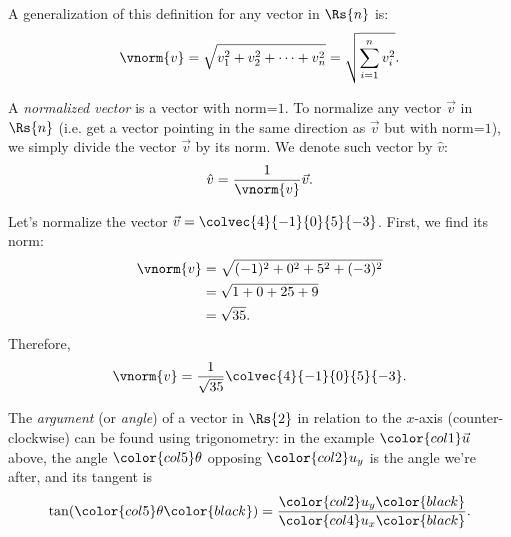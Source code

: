 A generalization of this definition for any vector in $\Rs{n}$ is:
\begin{equation*}
  \vnorm{v} = \sqrt{v_{1}^{2} + v_{2}^{2} + \dots + v_{n}^{2}} = \sqrt{\sum\limits_{i=1}^{n}v_{i}^{2}}.
\end{equation*}

A \emph{normalized vector} is a vector with norm=$1$. To normalize any vector $\vec{v}$ in $\Rs{n}$ (i.e. get a vector pointing in the same direction as $\vec{v}$ but with norm=$1$), we simply divide the vector $\vec{v}$ by its norm. We denote such vector by $\hat{v}$:
\begin{equation*}
  \hat{v} = \frac{1}{\vnorm{v}}\vec{v}.
\end{equation*}

\begin{example}
  Let's normalize the vector $\vec{v} = \colvec{4}{-1}{0}{5}{-3}$. First, we find its norm:
  \begin{align*}
  \vnorm{v} &= \sqrt{(-1)^{2} + 0^{2} + 5^{2} + (-3)^{2}}\\
  &= \sqrt{1 + 0 + 25 + 9}\\
  &= \sqrt{35}.
  \end{align*}
  Therefore,
  \begin{align*}
  \vnorm{v}=\frac{1}{\sqrt{35}}\colvec{4}{-1}{0}{5}{-3}.
  \end{align*}
\end{example}

The \emph{argument} (or \emph{angle}) of a vector in $\Rs{2}$ in relation to the $x$-axis (counter-clockwise) can be found using trigonometry: in the example $\color{col1}\vec{u}$ above, the angle $\color{col5}\theta$ opposing $\color{col2}u_{y}$ is the angle we're after, and its tangent is
\begin{equation*}
  \tan(\color{col5}\theta\color{black}) = \frac{\color{col2}u_{y}\color{black}}{\color{col4}u_{x}\color{black}}.
\end{equation*}
\begin{figure}[H]
  \centering
\end{figure}

